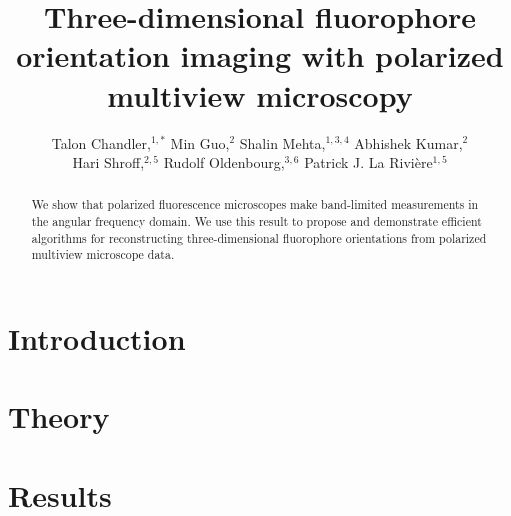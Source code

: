 \documentclass[letterpaper,10pt]{article}
\begin{document}
\title{Three-dimensional fluorophore orientation imaging with polarized multiview microscopy}

\author{Talon Chandler,${}^{1,*}$ Min Guo,${}^2$ Shalin Mehta,${}^{1,3,4}$ Abhishek Kumar,${}^2$\\ Hari Shroff,${}^{2,5}$ Rudolf Oldenbourg,${}^{3,6}$ Patrick J. La Rivi\`ere${}^{1,5}$}

\address{${}^1$Department of Radiology, University of Chicago, Chicago, Illinois 60637, USA.\\ ${}^2$Section on High Resolution Optical Imaging, National Institute of Biomedical Imaging\\ and Bioengineering, National Institutes of Health, Bethesda, Maryland 20892, USA.\\ ${}^3$Bell Center, Marine Biological Laboratory, Woods Hole, Massachusetts 02543, USA.\\ ${}^4$(present address) Chan Zuckerberg Biohub, San Francisco, California 94158, USA.\\ ${}^5$Whitman Center, Marine Biological Laboratory, Woods Hole, Massachusetts 02543, USA.\\ ${}^6$Department of Physics, Brown University, Providence, Rhode Island 02912, USA.}

\begin{abstract}
  We show that polarized fluorescence microscopes make band-limited measurements
  in the angular frequency domain. We use this result to propose and demonstrate
  efficient algorithms for reconstructing three-dimensional fluorophore
  orientations from polarized multiview microscope data.
\end{abstract}


\section{Introduction}


\section{Theory}
\cite{chandler}
\cite{barrett} 
\section{Results}
\end{document}
